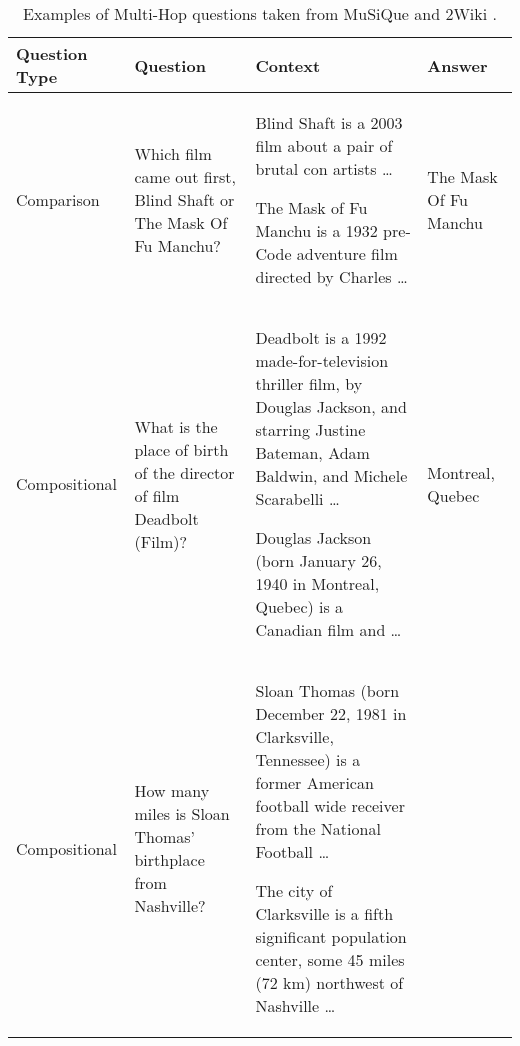 \begin{table}[h]
    \centering
    \small
    \begin{tabular}{
        >{\raggedright\arraybackslash}p{2cm}  %
        >{\raggedright\arraybackslash}p{3.2cm}  %
        >{\raggedright\arraybackslash}p{4.8cm}  %
        >{\raggedright\arraybackslash}p{1.6cm}    %
    }
        \toprule
        \textbf{\scriptsize Question Type} &
        \textbf{\scriptsize Question} &
        \textbf{\scriptsize Context} &
        \textbf{\scriptsize Answer} \\
        \midrule
        Comparison & Which film came out first, Blind Shaft or The Mask Of Fu Manchu? & 
        Blind Shaft is a 2003 film about a pair of brutal con artists \ldots\par\vspace{.5\baselineskip}
        The Mask of Fu Manchu is a 1932 pre-Code adventure film directed by Charles \ldots\par\vspace{.5\baselineskip} & 
        The Mask Of Fu Manchu \\

        Compositional & What is the place of birth of the director of film Deadbolt (Film)? & 
        Deadbolt is a 1992 made-for-television thriller film, by Douglas Jackson, and starring Justine Bateman, Adam Baldwin, and Michele Scarabelli \ldots\par\vspace{.5\baselineskip}
        Douglas Jackson (born January 26, 1940 in Montreal, Quebec) is a Canadian film and \ldots\par\vspace{.5\baselineskip} & 
        Montreal, Quebec \\

        Compositional & How many miles is Sloan Thomas' birthplace from Nashville? & 
        Sloan Thomas (born December 22, 1981 in Clarksville, Tennessee) is a former American football wide receiver from the National Football \ldots\par\vspace{.5\baselineskip}
        The city of Clarksville is a fifth significant population center, some 45 miles (72 km) northwest of Nashville \ldots\ & 
        45 \\
        \bottomrule
    \end{tabular}
    \caption{\small Examples of Multi-Hop questions taken from MuSiQue and 2Wiki \cite{trivedi2021musique}\cite{ho-etal-2020-constructing}.}
    \label{tab:questions}
\end{table}
